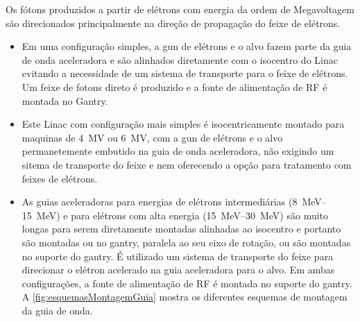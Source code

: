 \documentclass[11pt,a4paper]{article}
\begin{document}
    Os fótons produzidos a partir de elétrons com energia da ordem de Megavoltagem são direcionados principalmente na direção de propagação do feixe de elétrons. 
            
    \begin{itemize}
		\item Em uma configuração simples, a gun de elétrons e o alvo fazem parte da guia de onda aceleradora e são alinhados diretamente com o isocentro do Linac evitando a necessidade de um sistema de transporte para o feixe de elétrons. Um feixe de fotons direto é produzido e a fonte de alimentação de RF é montada no Gantry.
		
		\item Este Linac com configuração mais simples é isocentricamente montado para maquinas de \qty{4}{MV} ou \qty{6}{MV}, com a gun de elétrons e o alvo permanetemente embutido na guia de onda aceleradora, não exigindo um sitema de transporte do feixe e nem oferecendo a opção para tratamento com feixes de elétrons.
		
		\item As guias aceleradoras para energias de elétrons intermediárias (\qtyrange{8}{15}{MeV}) e para elétrons com alta energia (\qtyrange{15}{30}{MeV}) são muito longas para serem diretamente montadas alinhadas ao isocentro e portanto são montadas ou no gantry, paralela ao seu eixo de rotação, ou são montadas no suporte do gantry. É utilizado um sistema de transporte do feixe para direcionar o elétron acelerado na guia aceleradora para o alvo. Em ambas configurações, a fonte de alimentação de RF é montada no suporte do gantry. A \ref{fig:esquemasMontagemGuia} mostra os diferentes esquemas de montagem da guia de onda.
	\end{itemize}
             
\end{document}
